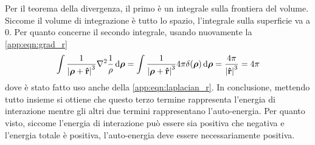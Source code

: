 Per il teorema della divergenza, il primo è un integrale sulla frontiera del volume. Siccome il volume di integrazione
è tutto lo spazio, l'integrale sulla superficie va a $0$. Per quanto concerne il secondo integrale, usando nuovamente
la \eqref{app:eqn:grad_r}
\[
    \int\rec{\abs{\vb*{\rho}+\vu{r}}^3}\laplacian{\rec{\rho}}\dd{\vb*{\rho}}=
    \int\rec{\abs{\vb*{\rho}+\vu{r}}^3}4\pi\delta(\vb*{\rho})\dd{\vb*{\rho}}=
    \frac{4\pi}{\abs{\vu{r}}^3}=4\pi
\]
dove è stato fatto uso anche della \eqref{app:eqn:laplacian_r}. In conclusione, mettendo tutto insieme si ottiene che
questo terzo termine rappresenta l'energia di interazione mentre gli altri due termini rappresentano l'auto-energia.
Per quanto visto, siccome l'energia di interazione può essere sia positiva che negativa e l'energia
totale è positiva, l'auto-energia deve essere necessariamente positiva.
